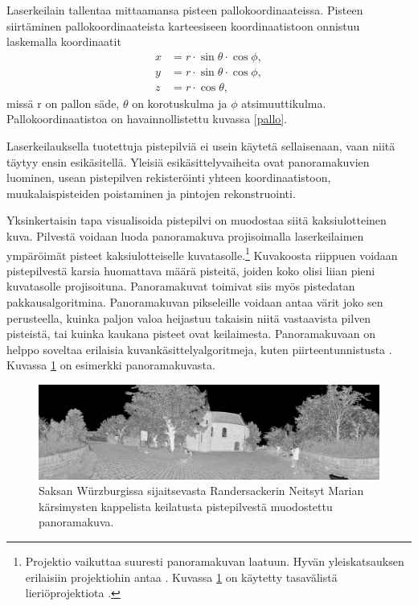 Laserkeilain tallentaa mittaamansa pisteen pallokoordinaateissa. Pisteen siirtäminen pallokoordinaateista karteesiseen koordinaatistoon onnistuu laskemalla koordinaatit 
\begin{equation}
    \begin{split}
        x&=r \cdot \sin \theta \cdot \cos \phi,\\ 
        y&=r \cdot \sin \theta \cdot \cos \phi,\\
        z&=r \cdot \cos \theta,    
    \end{split}
\end{equation}
missä r on pallon säde, $\theta$ on korotuskulma ja $\phi$ atsimuuttikulma. Pallokoordinaatistoa on havainnollistettu kuvassa \ref{pallo}.

Laserkeilauksella tuotettuja pistepilviä ei usein käytetä sellaisenaan, vaan niitä täytyy ensin esikäsitellä. Yleisiä esikäsittelyvaiheita ovat panoramakuvien luominen, usean pistepilven rekisteröinti yhteen koordinaatistoon, muukalaispisteiden poistaminen ja pintojen rekonstruointi.

Yksinkertaisin tapa visualisoida pistepilvi on muodostaa siitä kaksiulotteinen kuva. Pilvestä voidaan luoda panoramakuva projisoimalla laserkeilaimen ympäröimät pisteet kaksiulotteiselle kuvatasolle.\footnote{Projektio vaikuttaa suuresti panoramakuvan laatuun. Hyvän yleiskatsauksen erilaisiin projektiohin antaa \cite{proj}. Kuvassa \ref{img:pano} on käytetty tasavälistä lieriöprojektiota .} Kuvakoosta riippuen voidaan pistepilvestä karsia huomattava määrä pisteitä, joiden koko olisi liian pieni kuvatasolle projisoituna. Panoramakuvat toimivat siis myös pistedatan pakkausalgoritmina. Panoramakuvan pikseleille voidaan antaa värit joko sen perusteella, kuinka paljon valoa heijastuu takaisin niitä vastaavista pilven pisteistä, tai kuinka kaukana pisteet ovat keilaimesta. Panoramakuvaan on helppo soveltaa erilaisia kuvankäsittelyalgoritmeja, kuten piirteentunnistusta . Kuvassa \ref{img:pano} on esimerkki panoramakuvasta.

\begin{figure}
    \centering
    \includegraphics[width=\textwidth]{img/pano.png}
    \caption{Saksan Würzburgissa sijaitsevasta Randersackerin Neitsyt Marian kärsimysten kappelista keilatusta pistepilvestä muodostettu panoramakuva.}
    \label{img:pano}
\end{figure}

